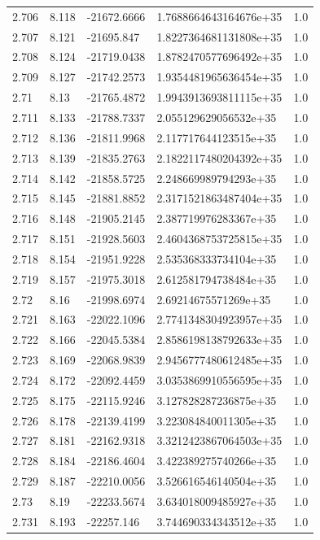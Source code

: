 \begin{tabular}{lllll}
2.706 & 8.118 & -21672.6666 & 1.7688664643164676e+35 & 1.0 \\
2.707 & 8.121 & -21695.847 & 1.8227364681131808e+35 & 1.0 \\
2.708 & 8.124 & -21719.0438 & 1.8782470577696492e+35 & 1.0 \\
2.709 & 8.127 & -21742.2573 & 1.9354481965636454e+35 & 1.0 \\
2.71 & 8.13 & -21765.4872 & 1.9943913693811115e+35 & 1.0 \\
2.711 & 8.133 & -21788.7337 & 2.055129629056532e+35 & 1.0 \\
2.712 & 8.136 & -21811.9968 & 2.117717644123515e+35 & 1.0 \\
2.713 & 8.139 & -21835.2763 & 2.1822117480204392e+35 & 1.0 \\
2.714 & 8.142 & -21858.5725 & 2.248669989794293e+35 & 1.0 \\
2.715 & 8.145 & -21881.8852 & 2.3171521863487404e+35 & 1.0 \\
2.716 & 8.148 & -21905.2145 & 2.387719976283367e+35 & 1.0 \\
2.717 & 8.151 & -21928.5603 & 2.4604368753725815e+35 & 1.0 \\
2.718 & 8.154 & -21951.9228 & 2.535368333734104e+35 & 1.0 \\
2.719 & 8.157 & -21975.3018 & 2.612581794738484e+35 & 1.0 \\
2.72 & 8.16 & -21998.6974 & 2.69214675571269e+35 & 1.0 \\
2.721 & 8.163 & -22022.1096 & 2.7741348304923957e+35 & 1.0 \\
2.722 & 8.166 & -22045.5384 & 2.8586198138792633e+35 & 1.0 \\
2.723 & 8.169 & -22068.9839 & 2.9456777480612485e+35 & 1.0 \\
2.724 & 8.172 & -22092.4459 & 3.0353869910556595e+35 & 1.0 \\
2.725 & 8.175 & -22115.9246 & 3.127828287236875e+35 & 1.0 \\
2.726 & 8.178 & -22139.4199 & 3.223084840011305e+35 & 1.0 \\
2.727 & 8.181 & -22162.9318 & 3.3212423867064503e+35 & 1.0 \\
2.728 & 8.184 & -22186.4604 & 3.422389275740266e+35 & 1.0 \\
2.729 & 8.187 & -22210.0056 & 3.526616546140504e+35 & 1.0 \\
2.73 & 8.19 & -22233.5674 & 3.634018009485927e+35 & 1.0 \\
2.731 & 8.193 & -22257.146 & 3.744690334343512e+35 & 1.0 \\

\end{tabular}
